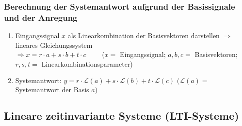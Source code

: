 		\subsubsection{Berechnung der Systemantwort aufgrund der Basissignale und der Anregung}
			\begin{enumerate}
				\item Eingangssignal $x$ als Linearkombination der Basisvektoren darstellen	$\Rightarrow$ lineares Gleichungssystem\\
				\quad $\Rightarrow x=r\cdot a + s\cdot b + t\cdot c\qquad$ ($x=$ Eingangssignal; $a,b,c=$ Basisvektoren; $r,s,t=$ Linearkombinationsparameter)\\ 
				\item Systemantwort: \quad $y=r\cdot \mathcal{L}(a) + s\cdot \mathcal{L}(b) + t\cdot \mathcal{L}(c)$ \qquad\quad $(\mathcal{L}(a)=$ Systemantwort der Basis $a$)
			\end{enumerate}
	
	\subsection{Lineare zeitinvariante Systeme (LTI-Systeme) }
	
